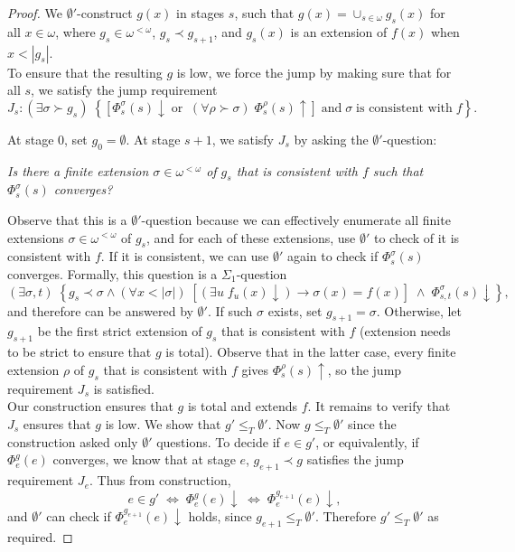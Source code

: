 \documentclass{article}
\begin{document}
  \begin{proof}
    We $\emptyset'$-construct $g(x)$ in stages $s$, such that
    $g(x)=\cup_{s\in\omega} g_s(x)$ for all $x\in\omega$, where $g_s\in
    \omega^{<\omega}$, $g_s\prec g_{s+1}$, and $g_s(x)$ is an extension of
    $f(x)$ when $x<|g_s|$. \\

    To ensure that the resulting $g$ is low, we force the jump by
    making sure that for all $s$, we satisfy the jump requirement
    \[J_s: (\exists \sigma\succ g_s)\; \left\{ \left[
    \Phi_s^{\sigma}(s)\downarrow\; \text{or}\;\; (\forall
    \rho\succ\sigma)\; \Phi_s^{\rho}(s)\uparrow \right]\; \text{and}\;
    \sigma\; \text{is consistent with}\; f\right\}.\]

    At stage 0, set $g_0=\emptyset$. At stage $s+1$, we satisfy $J_s$ by
    asking the $\emptyset'$-question:
    \begin{center}
      \textit{Is there a finite extension $\sigma\in\omega^{<\omega}$ of
      $g_s$ that is consistent with $f$ such that $\Phi^\sigma_s(s)$
      converges?}
    \end{center}

    Observe that this is a $\emptyset'$-question because we can
    effectively enumerate all finite extensions
    $\sigma\in\omega^{<\omega}$ of $g_s$, and for each of these extensions,
    use $\emptyset'$ to check of it is consistent with $f$. If it is
    consistent, we can use $\emptyset'$ again to check if
    $\Phi^\sigma_s(s)$ converges. Formally, this question is a
    $\Sigma_1$-question
    \[(\exists \sigma,t)\; \left\{ g_s\prec\sigma \wedge (\forall
    x<|\sigma|)\; \left[ (\exists u\; f_u(x)\downarrow)
    \rightarrow\sigma(x)=f(x) \right]\; \wedge\;
    \Phi^\sigma_{s,t}(s)\downarrow \right\},\]
    and therefore can be answered by $\emptyset'$. If such $\sigma$ exists,
    set $g_{s+1}=\sigma$. Otherwise, let $g_{s+1}$ be the first strict
    extension of $g_s$ that is consistent with $f$ (extension needs to be
    strict to ensure that $g$ is total). Observe that in the latter case,
    every finite extension $\rho$ of $g_s$ that is consistent with $f$
    gives $\Phi_s^\rho(s)\uparrow$, so the jump requirement $J_s$ is
    satisfied. \\

    Our construction ensures that $g$ is total and extends $f$. It remains
    to verify that $J_s$ ensures that $g$ is low. We show that
    $g'\leq_T\emptyset'$. Now $g\leq_T\emptyset'$ since the construction
    asked only $\emptyset'$ questions. To decide if $e\in g'$, or
    equivalently, if $\Phi_e^g(e)$ converges, we know that at stage $e$,
    $g_{e+1}\prec g$ satisfies the jump requirement $J_e$. Thus from
    construction, \[e\in g'\; \Leftrightarrow\; \Phi_e^g(e)\downarrow\;
    \Leftrightarrow\; \Phi_e^{g_{e+1}}(e)\downarrow,\] and $\emptyset'$ can
    check if $\Phi_e^{g_{e+1}}(e)\downarrow$ holds, since $g_{e+1}\leq_T
    \emptyset'$. Therefore $g'\leq_T\emptyset'$ as required.
  \end{proof}
\end{document}
